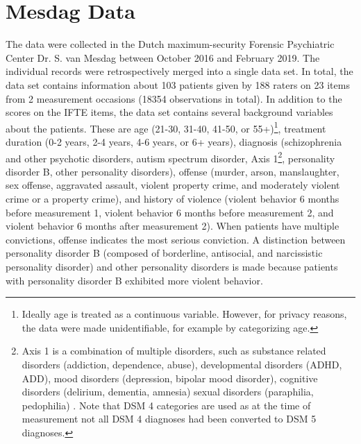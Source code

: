 \documentclass[a4paper,11pt]{article}
\newcommand{\DB}[1]{\todo[inline, color=colorDon,caption={}]{DB: {#1}}}
\begin{document}
\section{Mesdag Data}
The data were collected in the Dutch maximum-security Forensic Psychiatric Center Dr. S. van Mesdag between October 2016 and February 2019.
The individual records were retrospectively merged into a single data set. 
In total, the data set contains information about 103 patients given by 188 raters on 23 items from 2 measurement occasions (18354 observations in total).
In addition to the scores on the IFTE items, the data set contains several background variables about the patients.
These are age (21-30, 31-40, 41-50, or 55+)\footnote{Ideally age is treated as a continuous variable. However, for privacy reasons, the data were made unidentifiable, for example by categorizing age.}, treatment duration (0-2 years, 2-4 years, 4-6 years, or 6+ years), diagnosis (schizophrenia and other psychotic disorders, autism spectrum disorder, Axis 1\footnote{Axis 1 is a combination of multiple disorders, such as substance related disorders (addiction, dependence, abuse), developmental disorders (ADHD, ADD),  mood disorders (depression, bipolar mood disorder), cognitive disorders (delirium, dementia, amnesia) sexual disorders (paraphilia, pedophilia) \parencite{segal2010diagnostic}. Note that DSM 4 categories are used as at the time of measurement not all DSM 4 diagnoses had been converted to DSM 5 diagnoses.}, personality disorder B, other personality disorders), offense (murder, arson, manslaughter, sex offense, aggravated assault, violent property crime, and moderately violent crime or a property crime), and history of violence (violent behavior 6 months before measurement 1, violent behavior 6 months before measurement 2, and violent behavior 6 months after measurement 2). When patients have multiple convictions, offense indicates the most serious conviction. A distinction between personality disorder B (composed of borderline, antisocial, and narcissistic personality disorder) and other personality disorders is made because patients with personality disorder B exhibited more violent behavior.
\end{document}
